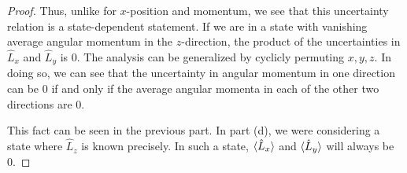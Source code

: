 \documentclass[../psets.tex]{subfiles}
\begin{document}
\begin{enumerate}
\begin{enumerate}
\begin{proof}
            Thus, unlike for $x$-position and momentum, we see that this uncertainty relation is a state-dependent statement. If we are in a state with vanishing average angular momentum in the $z$-direction, the product of the uncertainties in $\hat{L}_x$ and $\hat{L}_y$ is 0. The analysis can be generalized by cyclicly permuting $x,y,z$. In doing so, we can see that the uncertainty in angular momentum in one direction can be 0 if and only if the average angular momenta in each of the other two directions are 0.\par
            This fact can be seen in the previous part. In part (d), we were considering a state where $\hat{L}_z$ is known precisely. In such a state, $\langle{\hat{L}_x}\rangle$ and $\langle{\hat{L}_y}\rangle$ will always be 0.
        \end{proof}
    \end{enumerate}
\end{enumerate}
\end{document}
